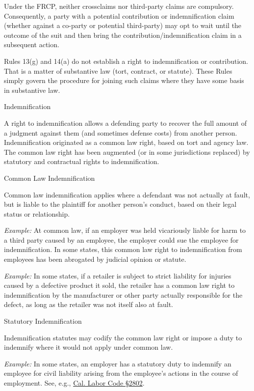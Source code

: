 \documentclass[11pt,letterpaper,twoside]{article}
\begin{document}
Under the FRCP, neither crossclaims nor third-party claims are
compulsory. Consequently, a party with a potential contribution or
indemnification claim (whether against a co-party or potential
third-party) may opt to wait until the outcome of the suit and then
bring the contribution/indemnification claim in a subsequent action.

Rules 13(g) and 14(a) do not establish a right to indemnification or
contribution. That is a matter of substantive law (tort, contract, or
statute). These Rules simply govern the procedure for joining such
claims where they have some basis in substantive law.

{Indemnification}

A right to indemnification allows a defending party to recover the full
amount of a judgment against them (and sometimes defense costs) from
another person. Indemnification originated as a common law right, based
on tort and agency law. The common law right has been augmented (or in
some jurisdictions replaced) by statutory and contractual rights to
indemnification.

{Common Law Indemnification}

Common law indemnification applies where a defendant was not actually at
fault, but is liable to the plaintiff for another person's conduct,
based on their legal status or relationship.

\emph{Example:} At common law, if an employer was held vicariously
liable for harm to a third party caused by an employee, the employer
could sue the employee for indemnification. In some states, this common
law right to indemnification from employees has been abrogated by
judicial opinion or statute.

\emph{Example:} In some states, if a retailer is subject to strict
liability for injuries caused by a defective product it sold, the
retailer has a common law right to indemnification by the manufacturer
or other party actually responsible for the defect, as long as the
retailer was not itself also at fault.

{Statutory Indemnification}

Indemnification statutes may codify the common law right or impose a
duty to indemnify where it would not apply under common law.

\emph{Example:} In some states, an employer has a statutory duty to
indemnify an employee for civil liability arising from the employee's
actions in the course of employment. See, e.g.,
\href{https://leginfo.legislature.ca.gov/faces/codes_displaySection.xhtml?sectionNum=2802.&lawCode=LAB}{Cal.
Labor Code §2802}.
\end{document}
